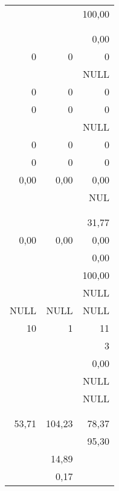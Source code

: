 \begin{tabular}{|r|r|r|}
	               &        &       100,00 \\
	               &        &              \\
	               &        &              \\
	               &        &         0,00 \\
	             0 &      0 &            0 \\
	               &        &         NULL \\
	             0 &      0 &            0 \\
	             0 &      0 &            0 \\
	               &        &         NULL \\
	             0 &      0 &            0 \\
	             0 &      0 &            0 \\
	          0,00 &   0,00 &         0,00 \\
	               &        &          NUL \\
	               &        &              \\
	               &        &              \\
	               &        &        31,77 \\
	          0,00 &   0,00 &         0,00 \\
	               &        &         0,00 \\
	               &        &       100,00 \\
	               &        &         NULL \\
	          NULL &   NULL &         NULL \\
	            10 &      1 &           11 \\
	               &        &            3 \\
	               &        &         0,00 \\
	               &        &         NULL \\
	               &        &         NULL \\
	               &        &              \\
	               &        &              \\
	         53,71 & 104,23 &        78,37 \\
	               &        &        95,30 \\
	               &  14,89 &              \\
	               &   0,17 &              \\

\end{tabular}
